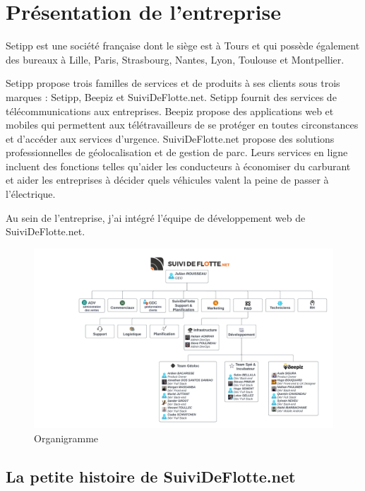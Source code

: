 \section{Présentation de l'entreprise}\label{sec:presentation-entreprise}

Setipp est une société française dont le siège est à Tours et qui possède également des bureaux à Lille, Paris, Strasbourg, Nantes, Lyon, Toulouse et Montpellier.

Setipp propose trois familles de services et de produits à ses clients sous trois marques : Setipp, Beepiz et SuiviDeFlotte.net. Setipp fournit des services de télécommunications aux entreprises. Beepiz propose des applications web et mobiles qui permettent aux télétravailleurs de se protéger en toutes circonstances et d'accéder aux services d'urgence. SuiviDeFlotte.net propose des solutions professionnelles de géolocalisation et de gestion de parc. Leurs services en ligne incluent des fonctions telles qu'aider les conducteurs à économiser du carburant et aider les entreprises à décider quels véhicules valent la peine de passer à l'électrique.

Au sein de l'entreprise, j'ai intégré l'équipe de développement web de SuiviDeFlotte.net.

\begin{figure}
    \centering
    \includegraphics[width=\textwidth]{img/organogram}
    \caption{Organigramme}
    \label{fig:organogram}
\end{figure}

\subsection{La petite histoire de SuiviDeFlotte.net}\label{subsec:histoire-sdf}

